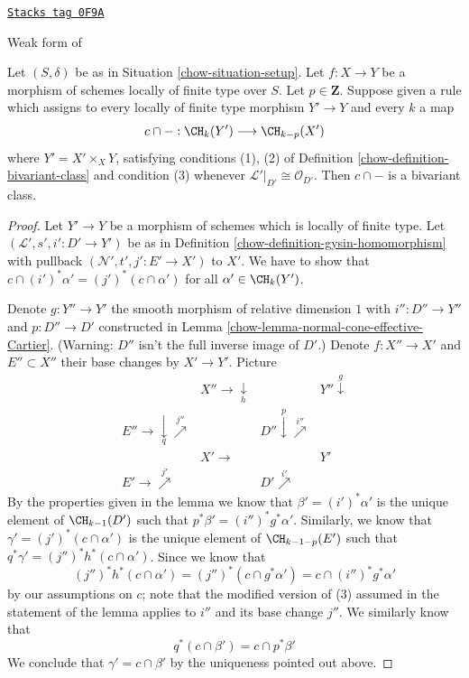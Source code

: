 \begin{lemma}
\label{chow-lemma-bivariant-weaker}
\href{https://stacks.math.columbia.edu/tag/0F9A}{\texttt{Stacks tag 0F9A}}

\begin{reference}
Weak form of \cite[Theorem 17.1]{F}
\end{reference}
Let $(S, \delta)$ be as in Situation \ref{chow-situation-setup}.
Let $f : X \to Y$ be a morphism of schemes locally of finite type over $S$.
Let $p \in \mathbf{Z}$. Suppose given a rule
which assigns to every locally of finite type morphism $Y' \to Y$
and every $k$ a map
$$
c \cap - : \CH_k(Y') \longrightarrow \CH_{k - p}(X')
$$
where $Y' = X' \times_X Y$, satisfying conditions (1), (2) of
Definition \ref{chow-definition-bivariant-class}
and condition (3) whenever $\mathcal{L}'|_{D'} \cong \mathcal{O}_{D'}$. Then
$c \cap -$ is a bivariant class.
\end{lemma}

\begin{proof}

Let $Y' \to Y$ be a morphism of schemes which is locally of finite type.
Let $(\mathcal{L}', s', i' : D' \to Y')$ be as in
Definition \ref{chow-definition-gysin-homomorphism}
with pullback $(\mathcal{N}', t', j' : E' \to X')$ to $X'$.
We have to show that $c \cap (i')^*\alpha' = (j')^*(c \cap \alpha')$
for all $\alpha' \in \CH_k(Y')$.

\medskip\noindent
Denote $g : Y'' \to Y'$ the smooth morphism of relative
dimension $1$ with $i'' : D'' \to Y''$ and $p : D'' \to D'$
constructed in Lemma \ref{chow-lemma-normal-cone-effective-Cartier}.
(Warning: $D''$ isn't the full inverse image of $D'$.)
Denote $f : X'' \to X'$ and $E'' \subset X''$
their base changes by $X' \to Y'$. Picture
$$
\begin{array}{cccc} & X'' \longrightarrow\underset{h}{\downarrow} &  & Y'' \overset{g}{\downarrow} \\ E'' \longrightarrow\underset{q}{\downarrow}\overset{j''}{\nearrow} &  & D'' \overset{p}{\downarrow}\overset{i''}{\nearrow} &  \\  & X' \longrightarrow &  & Y' \\ E' \longrightarrow\overset{j'}{\nearrow} &  & D' \overset{i'}{\nearrow} & \end{array}
$$
By the properties given in the lemma we know that $\beta' = (i')^*\alpha'$
is the unique element of $\CH_{k - 1}(D')$ such that
$p^*\beta' = (i'')^*g^*\alpha'$. Similarly, we know that
$\gamma' = (j')^*(c \cap \alpha')$ is the unique element of
$\CH_{k - 1 - p}(E')$ such that $q^*\gamma' = (j'')^*h^*(c \cap \alpha')$.
Since we know that
$$
(j'')^*h^*(c \cap \alpha') =
(j'')^*(c \cap g^*\alpha') =
c \cap (i'')^*g^*\alpha'
$$
by our assumptions on $c$; note that the modified version of (3)
assumed in the statement of the lemma applies to $i''$
and its base change $j''$. We similarly know that
$$
q^*(c \cap \beta') = c \cap p^*\beta'
$$
We conclude that $\gamma' = c \cap \beta'$ by the uniqueness pointed
out above.
\end{proof}

